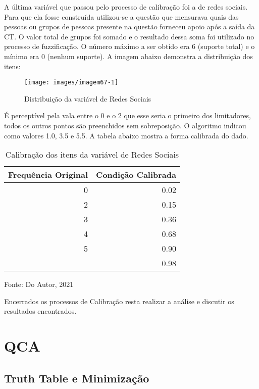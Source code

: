 \documentclass[
	12pt,				%
	oneside,			%
	a4paper,			%
	sumario=tradicional,
	english,			%
	brazil				%
	]{abntex2}
\newcommand{\bcenter}{\begin{center}}
\newcommand{\ecenter}{\end{center}}
\begin{document}
A última variável que passou pelo processo de calibração foi a de redes sociais. Para que ela fosse construída utilizou-se a questão que mensurava quais das pessoas ou grupos de pessoas presente na questão forneceu apoio após a saída da CT. O valor total de grupos foi somado e o resultado dessa soma foi utilizado no processo de fuzzificação. O número máximo a ser obtido era 6 (suporte total) e o mínimo era 0 (nenhum suporte). A imagem abaixo demonstra a distribuição dos itens:
\begin{figure}[H]

{\centering \texttt{[image: images/imagem67-1]} 

}

\caption{Distribuição da variável de Redes Sociais}\label{fig:imagem67}
\end{figure}
É perceptível pela vala entre o 0 e o 2 que esse seria o primeiro dos limitadores, todos os outros pontos são preenchidos sem sobreposição. O algoritmo indicou como valores 1.0, 3.5 e 5.5. A tabela abaixo mostra a forma calibrada do dado.
\begin{table}[H]

\caption{\label{tab:tab-redes}Calibração dos itens da variável de Redes Sociais}
\centering
\begin{tabular}[t]{rr}
\toprule
\textbf{Frequência Original} & \textbf{Condição Calibrada}\\
\midrule
0 & 0.02\\
2 & 0.15\\
3 & 0.36\\
4 & 0.68\\
5 & 0.90\\
\addlinespace
6 & 0.98\\
\bottomrule
\end{tabular}
\end{table}
\bcenter

Fonte: Do Autor, 2021
\ecenter

Encerrados os processos de Calibração resta realizar a análise e discutir os resultados encontrados.

\hypertarget{qca}{%
\section{QCA}\label{qca}}

\hypertarget{truth-table-e-minimizauxe7uxe3o}{%
\subsection{Truth Table e Minimização}\label{truth-table-e-minimizauxe7uxe3o}}
\end{document}
